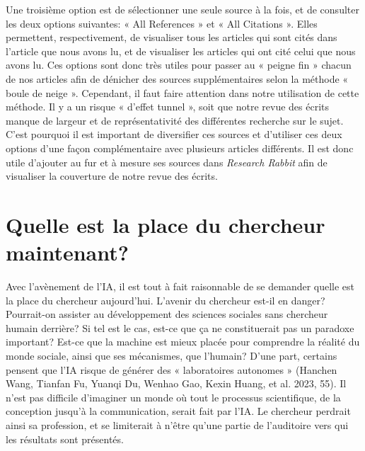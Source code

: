 \documentclass[
  letterpaper,
]{scrbook}
\begin{document}
Une troisième option est de sélectionner une seule source à la fois, et
de consulter les deux options suivantes: « All References » et « All
Citations ». Elles permettent, respectivement, de visualiser tous les
articles qui sont cités dans l'article que nous avons lu, et de
visualiser les articles qui ont cité celui que nous avons lu. Ces
options sont donc très utiles pour passer au « peigne fin » chacun de
nos articles afin de dénicher des sources supplémentaires selon la
méthode « boule de neige ». Cependant, il faut faire attention dans
notre utilisation de cette méthode. Il y a un risque « d'effet tunnel »,
soit que notre revue des écrits manque de largeur et de représentativité
des différentes recherche sur le sujet. C'est pourquoi il est important
de diversifier ces sources et d'utiliser ces deux options d'une façon
complémentaire avec plusieurs articles différents. Il est donc utile
d'ajouter au fur et à mesure ses sources dans \emph{Research Rabbit}
afin de visualiser la couverture de notre revue des écrits.

\hypertarget{quelle-est-la-place-du-chercheur-maintenant}{%
\section{Quelle est la place du chercheur
maintenant?}\label{quelle-est-la-place-du-chercheur-maintenant}}

Avec l'avènement de l'IA, il est tout à fait raisonnable de se demander
quelle est la place du chercheur aujourd'hui. L'avenir du chercheur
est-il en danger? Pourrait-on assister au développement des sciences
sociales sans chercheur humain derrière? Si tel est le cas, est-ce que
ça ne constituerait pas un paradoxe important? Est-ce que la machine est
mieux placée pour comprendre la réalité du monde sociale, ainsi que ses
mécanismes, que l'humain? D'une part, certains pensent que l'IA risque
de générer des « laboratoires autonomes » (Hanchen Wang, Tianfan Fu,
Yuanqi Du, Wenhao Gao, Kexin Huang, et al. 2023, 55). Il n'est pas
difficile d'imaginer un monde où tout le processus scientifique, de la
conception jusqu'à la communication, serait fait par l'IA. Le chercheur
perdrait ainsi sa profession, et se limiterait à n'être qu'une partie de
l'auditoire vers qui les résultats sont présentés.
\end{document}

